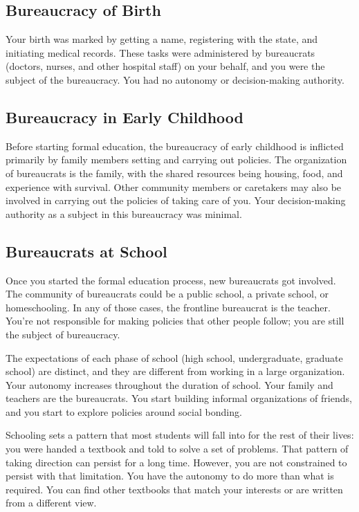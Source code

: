 \subsection*{Bureaucracy of Birth\label{sec:bureacracy-of-birth}}
Your birth was marked by getting a name, registering with the state, and initiating medical records. These tasks were administered by bureaucrats (doctors, nurses, and other hospital staff) on your behalf, and you were the subject of the bureaucracy. You had no autonomy or decision-making authority. 

\subsection*{Bureaucracy in Early Childhood\label{sec:bureaucracy-early-childhood}}
Before starting formal education, the bureaucracy of early childhood is inflicted primarily by family members setting and carrying out policies. The organization of bureaucrats is the family, with the shared resources being housing, food, and experience with survival. Other community members or caretakers may also be involved in carrying out the policies of taking care of you. Your decision-making authority as a subject in this bureaucracy was minimal. 

\subsection*{Bureaucrats at School\label{sec:bureaucracy-of-school}}
Once you started the formal education process, new bureaucrats got involved.  The community of bureaucrats could be a public school, a private school, or homeschooling. In any of those cases, the frontline bureaucrat is the teacher. You're not responsible for making policies that other people follow; you are still the subject of bureaucracy.


The expectations of each phase of school (high school, undergraduate, graduate school) are distinct, and they are different from working in a large organization. Your autonomy increases throughout the duration of school. %
Your family and teachers are the bureaucrats. You start building informal organizations of friends, and you start to explore policies around social bonding.

Schooling sets a pattern that most students will fall into for the rest of their lives: you were handed a textbook and told to solve a set of problems. That pattern of taking direction can persist for a long time. However, you are not constrained to persist with that limitation. You have the autonomy to do more than what is required. You can find other textbooks that match your interests or are written from a different view. 
%
%

